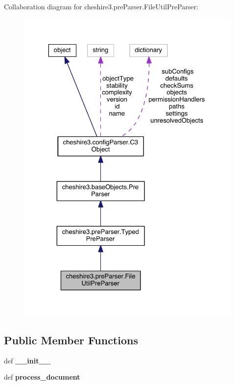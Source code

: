 Collaboration diagram for cheshire3.\-pre\-Parser.\-File\-Util\-Pre\-Parser\-:
\nopagebreak
\begin{figure}[H]
\begin{center}
\leavevmode
\includegraphics[width=325pt]{classcheshire3_1_1pre_parser_1_1_file_util_pre_parser__coll__graph}
\end{center}
\end{figure}
\subsection*{Public Member Functions}
\begin{DoxyCompactItemize}
\item 
\hypertarget{classcheshire3_1_1pre_parser_1_1_file_util_pre_parser_a2f25d62f8a939bb760d03bb2d7728cbb}{def {\bfseries \-\_\-\-\_\-init\-\_\-\-\_\-}}\label{classcheshire3_1_1pre_parser_1_1_file_util_pre_parser_a2f25d62f8a939bb760d03bb2d7728cbb}

\item 
\hypertarget{classcheshire3_1_1pre_parser_1_1_file_util_pre_parser_a9c29f888a7607fa5145e1ab5a9c0c045}{def {\bfseries process\-\_\-document}}\label{classcheshire3_1_1pre_parser_1_1_file_util_pre_parser_a9c29f888a7607fa5145e1ab5a9c0c045}

\end{DoxyCompactItemize}
